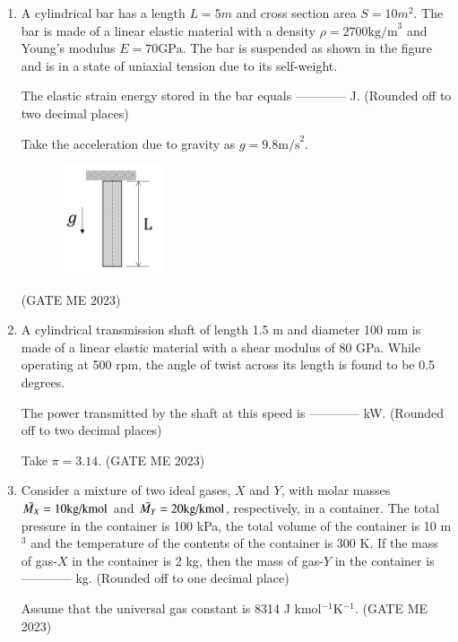 \documentclass[journal]{IEEEtran}
\begin{document}
\begin{enumerate}
\item A cylindrical bar has a length $ L = 5  m $ and cross section area $ S = 10  m^2 $. The bar is made of a linear elastic material with a density $ \rho = 2700  \text{kg/m}^3 $ and Young’s modulus $ E = 70  \text{GPa} $. The bar is suspended as shown in the figure and is in a state of uniaxial tension due to its self-weight. 

The elastic strain energy stored in the bar equals ------------ J. (Rounded off to two decimal places) 

Take the acceleration due to gravity as $ g = 9.8  \text{m/s}^2 $.

\begin{figure}[H]
\centering
\includegraphics[width=0.3\textwidth]{Fig 52.png}
\caption{}
\label{fig:question59}
\end{figure}
\hfill (GATE ME 2023)

\item A cylindrical transmission shaft of length 1.5 m and diameter 100 mm is made of a linear elastic material with a shear modulus of 80 GPa. While operating at 500 rpm, the angle of twist across its length is found to be 0.5 degrees. 

The power transmitted by the shaft at this speed is ------------ kW. (Rounded off to two decimal places) 

Take $ \pi = 3.14 $.
\hfill (GATE ME 2023)

\item Consider a mixture of two ideal gases, $ X $ and $ Y $, with molar masses $ \Bar{M_X} = 10  \text{kg/kmol} $ and $\Bar{ M_Y} = 20  \text{kg/kmol} $, respectively, in a container. The total pressure in the container is 100 kPa, the total volume of the container is 10 m$^3$ and the temperature of the contents of the container is 300 K. If the mass of gas-$ X $ in the container is 2 kg, then the mass of gas-$ Y $ in the container is ------------ kg. (Rounded off to one decimal place)

Assume that the universal gas constant is 8314 J kmol$^{-1}$K$^{-1}$.
\hfill (GATE ME 2023)


\end{enumerate}
\end{document}

